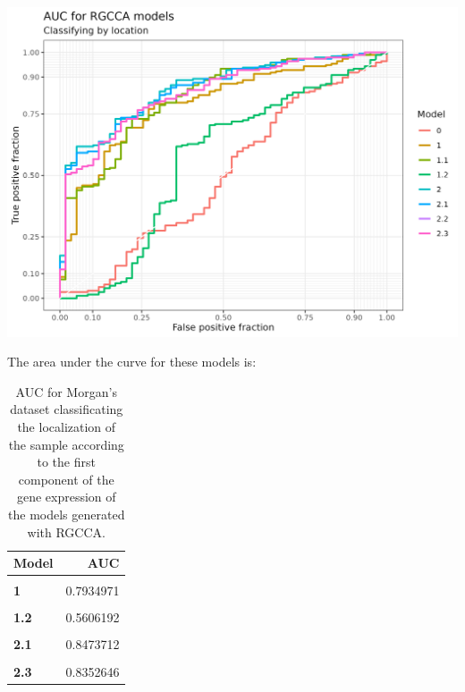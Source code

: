 \documentclass[
  a4paper,
]{book}
\let\origfigure\figure
\let\endorigfigure\endfigure
\renewenvironment{figure}[1][2] {
    \expandafter\origfigure\expandafter[!ht]
} {
    \endorigfigure
}
\begin{document}
\begin{figure}
\includegraphics[width=1\linewidth]{images/morgan-auc} \caption[AUC plot for Morgan's dataset]{AUC for Morgan's dataset classificating the localization of the sample according to the first component of the gene expression of the models generated with RGCCA.}\label{fig:morgan-auc-plot}
\end{figure}

The area under the curve for these models is:

\begin{table}[H]

\caption[AUC for Morgan's dataset]{\label{tab:morgan-auc}AUC for Morgan's dataset classificating the localization of the sample according to the first component of the gene expression of the models generated with RGCCA.}
\centering
\begin{tabular}[t]{>{}l||r}
\hline
Model & AUC\\
\hline
\textbf{\cellcolor{gray!6}{0}} & \cellcolor{gray!6}{0.4969734}\\
\hline
\textbf{1} & 0.7934971\\
\hline
\textbf{\cellcolor{gray!6}{1.1}} & \cellcolor{gray!6}{0.8161536}\\
\hline
\textbf{1.2} & 0.5606192\\
\hline
\textbf{\cellcolor{gray!6}{2}} & \cellcolor{gray!6}{0.8546351}\\
\hline
\textbf{2.1} & 0.8473712\\
\hline
\textbf{\cellcolor{gray!6}{2.2}} & \cellcolor{gray!6}{0.8352646}\\
\hline
\textbf{2.3} & 0.8352646\\
\hline
\end{tabular}
\end{table}
\end{document}
